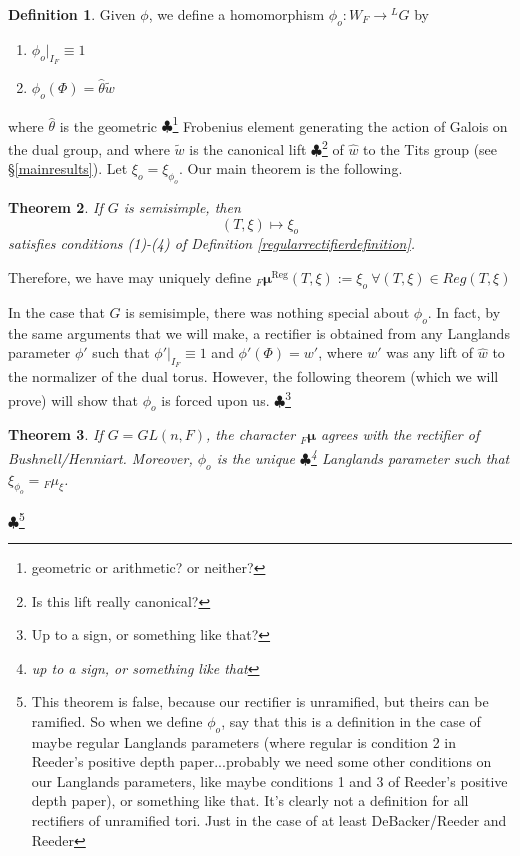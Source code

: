 \documentclass[11pt]{amsart}
\theoremstyle{plain}
\newtheorem{theorem}{Theorem}[section]
\newcommand{\MAxxx}[1]{$\clubsuit$\footnote{#1}}
\theoremstyle{definition}
\newtheorem{definition}[theorem]{Definition}
\begin{document}
\begin{definition}
Given $\phi$, we define a homomorphism $\phi_o : W_F \rightarrow {}^L G$ by
\begin{enumerate}
\item $\phi_o|_{I_F} \equiv 1$
\item $\phi_o(\Phi) = \hat{\theta} \tilde{w}$
\end{enumerate}
\end{definition}

where $\hat{\theta}$ is the geometric
\MAxxx{geometric or arithmetic? or neither?}
Frobenius element generating the action of Galois on
the dual group, and where $\tilde{w}$ is the canonical lift
\MAxxx{Is this lift really canonical?}
of $\hat{w}$ to the Tits group (see \S\ref{mainresults}).
Let $\xi_o = \xi_{\phi_o}$.  Our main theorem is the following.

\begin{theorem}
  If $G$ is semisimple, then $$(T, \xi) \mapsto
  \xi_o$$ satisfies conditions (1)-(4) of Definition \ref{regularrectifierdefinition}.
\end{theorem}

Therefore, we have may uniquely define
${}_F \boldsymbol\mu^{\mathrm{Reg}}(T,\xi)
:= \xi_o \ \forall (T,\xi) \in Reg(T,\xi)$

In the case that $G$ is semisimple, there was nothing special about
$\phi_o$.  In fact, by the same arguments that we will make, a
rectifier is obtained from any Langlands parameter $\phi'$ such that
$\phi'|_{I_F} \equiv 1$ and $\phi'(\Phi) = w'$, where $w'$ was any
lift of $\hat{w}$ to the normalizer of the dual torus.  However, the
following theorem (which we will prove) will show that $\phi_o$ is
forced upon us.
\MAxxx{Up to a sign, or something like that?}

\begin{theorem}
  If $G = GL(n,F)$, the character ${}_F \boldsymbol\mu$ agrees with
  the rectifier of Bushnell/Henniart.  Moreover, $\phi_o$ is the
  unique \MAxxx{up to a sign, or something like that} Langlands
  parameter such that $\xi_{\phi_o} = {}_F \mu_{\xi}$.
\end{theorem}\MAxxx{This theorem is false, because our rectifier is unramified, but theirs can be ramified.
So when we define $\phi_o$, say that this is a definition in the case of maybe regular Langlands parameters
(where regular is condition 2 in Reeder's positive depth paper...probably we need some other conditions on
our Langlands parameters, like maybe conditions 1 and 3 of Reeder's positive depth paper), or something like
that. It's clearly not a definition for all rectifiers of unramified tori. Just in the case of at least
DeBacker/Reeder and Reeder}
\end{document}

